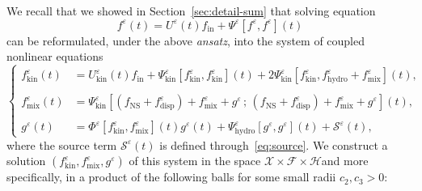 \documentclass[AHL,Unicode,longabstracts,published]{cedram}
\newcommand{\ini}{\mathrm{in}}
\newcommand{\ns}{\mathrm{NS}}
\newcommand{\hyd}{\mathrm{hydro}}
\newcommand{\mix}{\mathrm{mix}}
\newcommand{\kin}{\mathrm{kin}}
\newcommand{\disp}{\mathrm{disp}}
\renewcommand{\SS}{\mathcal{S}}
\newcommand{\FFF}{\mathscr{F}}
\newcommand{\HHH}{\mathscr{H}}
\newcommand{\GGG}{\mathscr{X}}
\newcommand{\SSSs}{\HHH}
\newcommand{\SSSl}{\GGG}
\newcommand{\SSSm}{\FFF}
\newcommand*\eps{{\varepsilon}}
\begin{document}
We recall that we showed in Section~\ref{sec:detail-sum} that solving equation
\[
f^\eps(t)=U^\eps(t)f_\ini+\Psi^\eps\left[f^\eps,f^\eps\right](t)
\]
can be reformulated, under the above \emph{ansatz}, into the system of coupled nonlinear equations
\begin{equation}\label{eq:systemKinMixG-1}
\begin{cases}
f^\eps_\kin(t) &= U^\eps_\kin(t) f_\ini + \Psi^\eps_\kin \left[f^\eps_\kin, f^\eps_\kin \right](t) + 2 \Psi^\eps_\kin\left[f^\eps_\kin, f^\eps_\hyd + f^\eps_\mix\right](t),\\
\\
f^\eps_\mix(t) &=\Psi^\eps_\kin\left[\left(f_\ns + f^\eps_\disp\right)+ f_\mix^\eps+g^\eps\,;\,\left(f_\ns + f^\eps_\disp\right)+ f_\mix^\eps+g^\eps \right](t),\\
\\
g^\eps(t) &= \Phi^\eps\left[f^\eps_\kin, f^\eps_\mix\right](t) g^\eps(t)+
\Psi^\eps_\hyd\left[g^\eps, g^\eps\right](t) + \SS^\eps(t),
\end{cases}
\end{equation}
where the source term $\SS^\eps(t)$ is defined through~\eqref{eq:source}. We construct a solution $(f^\eps_\kin, f^\eps_\mix, g^\eps)$ of this system in the space $ \SSSl \times \SSSm \times \SSSs $and more specifically, in a product of the following balls for some small radii $ c_2, c_3 >0$:
\end{document}

